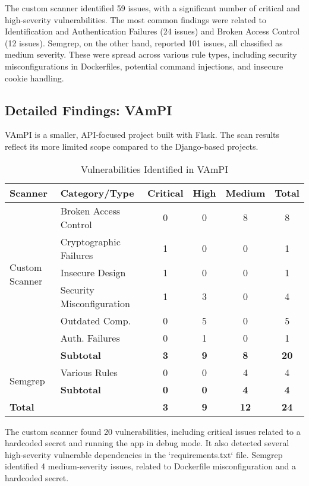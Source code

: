 The custom scanner identified 59 issues, with a significant number of critical and high-severity vulnerabilities. The most common findings were related to Identification and Authentication Failures (24 issues) and Broken Access Control (12 issues). Semgrep, on the other hand, reported 101 issues, all classified as medium severity. These were spread across various rule types, including security misconfigurations in Dockerfiles, potential command injections, and insecure cookie handling.

\subsection{Detailed Findings: VAmPI}

VAmPI is a smaller, API-focused project built with Flask. The scan results reflect its more limited scope compared to the Django-based projects.

\begin{table}[h!]
\centering
\caption{Vulnerabilities Identified in VAmPI}
\label{tab:vampi_vulns}
\begin{tabular}{|l|l|c|c|c|c|}
\hline
\textbf{Scanner} & \textbf{Category/Type} & \textbf{Critical} & \textbf{High} & \textbf{Medium} & \textbf{Total} \\
\hline
\multirow{6}{*}{Custom Scanner} & Broken Access Control & 0 & 0 & 8 & 8 \\
& Cryptographic Failures & 1 & 0 & 0 & 1 \\
& Insecure Design & 1 & 0 & 0 & 1 \\
& Security Misconfiguration & 1 & 3 & 0 & 4 \\
\& Vuln. & Outdated Comp. & 0 & 5 & 0 & 5 \\
\& Ident. & Auth. Failures & 0 & 1 & 0 & 1 \\
\cline{2-6}
& \textbf{Subtotal} & \textbf{3} & \textbf{9} & \textbf{8} & \textbf{20} \\
\hline
\multirow{2}{*}{Semgrep} & Various Rules & 0 & 0 & 4 & 4 \\
\cline{2-6}
& \textbf{Subtotal} & \textbf{0} & \textbf{0} & \textbf{4} & \textbf{4} \\
\hline
\multicolumn{2}{|l|}{\textbf{Total}} & \textbf{3} & \textbf{9} & \textbf{12} & \textbf{24} \\
\hline
\end{tabular}
\end{table}

The custom scanner found 20 vulnerabilities, including critical issues related to a hardcoded secret and running the app in debug mode. It also detected several high-severity vulnerable dependencies in the `requirements.txt` file. Semgrep identified 4 medium-severity issues, related to Dockerfile misconfiguration and a hardcoded secret.

